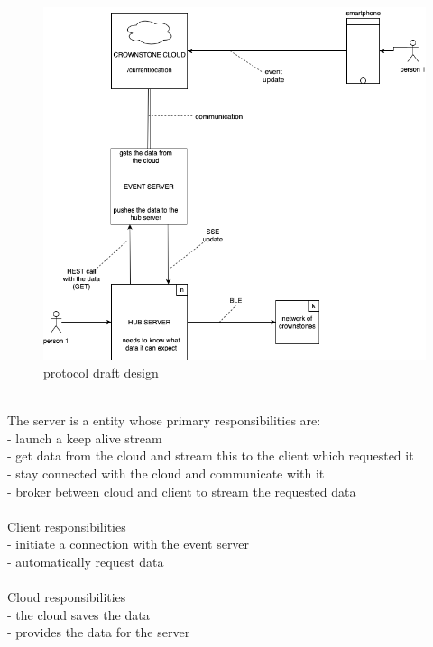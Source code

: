 \documentclass{article}
\begin{document}
\label{fig:protocolDraft}	
	\begin{figure}[H]
	\includegraphics[width=5in]{pictures/prototypeV3.png}
	\caption[Optional caption]{protocol draft design}
	\end{figure}
\\
The server is a entity whose primary responsibilities are: \\
- launch a keep alive stream\\
- get data from the cloud and stream this to the client which requested it\\
- stay connected with the cloud and communicate with it \\
- broker between cloud and client to stream the requested data\\
\\
Client responsibilities  \\
- initiate a connection with the event server\\
- automatically request data\\
\\
Cloud responsibilities  \\
-  the cloud saves the data\\
- provides the data for the server\\ 

\end{document}
